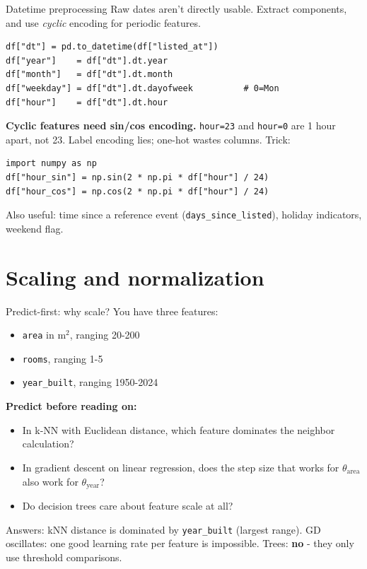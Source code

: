 \documentclass[aspectratio=169]{beamer}
\begin{document}
\begin{frame}[fragile]{Datetime preprocessing}
  Raw dates aren't directly usable. Extract components, and use \emph{cyclic} encoding for periodic features.
\begin{lstlisting}
df["dt"] = pd.to_datetime(df["listed_at"])
df["year"]    = df["dt"].dt.year
df["month"]   = df["dt"].dt.month
df["weekday"] = df["dt"].dt.dayofweek          # 0=Mon
df["hour"]    = df["dt"].dt.hour
\end{lstlisting}
  \textbf{Cyclic features need sin/cos encoding.} \texttt{hour=23} and \texttt{hour=0} are 1 hour apart, not 23. Label encoding lies; one-hot wastes columns. Trick:
\begin{lstlisting}
import numpy as np
df["hour_sin"] = np.sin(2 * np.pi * df["hour"] / 24)
df["hour_cos"] = np.cos(2 * np.pi * df["hour"] / 24)
\end{lstlisting}
  \vfill
  Also useful: time since a reference event (\texttt{days\_since\_listed}), holiday indicators, weekend flag.
\end{frame}

\section{Scaling and normalization}

\begin{frame}{Predict-first: why scale?}
  You have three features:
  \begin{itemize}
    \item \texttt{area} in m$^2$, ranging 20-200
    \item \texttt{rooms}, ranging 1-5
    \item \texttt{year\_built}, ranging 1950-2024
  \end{itemize}
  \vfill
  \pause
  \textbf{Predict before reading on:}
  \begin{itemize}
    \item In k-NN with Euclidean distance, which feature dominates the neighbor calculation?
    \item In gradient descent on linear regression, does the step size that works for $\theta_{\text{area}}$ also work for $\theta_{\text{year}}$?
    \item Do decision trees care about feature scale at all?
  \end{itemize}
  \vfill
  \pause
  Answers: kNN distance is dominated by \texttt{year\_built} (largest range). GD oscillates: one good learning rate per feature is impossible. Trees: \textbf{no} - they only use threshold comparisons.
\end{frame}
\end{document}
